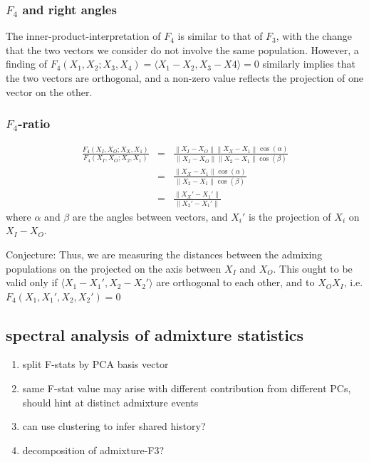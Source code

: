 \documentclass[10pt,a4paper]{article}
\newcommand{\norm}[1]{\left\lVert#1\right\rVert}
\begin{document}
\subsubsection{$F_4$ and right angles}
The inner-product-interpretation of $F_4$ is similar to that of $F_3$, with the change that the two vectors we consider do not involve the same population. However, a finding of $F_4(X_1, X_2; X_3, X_4) = \langle X_1 - X_2, X_3 - X4 \rangle = 0$ similarly implies that the two vectors are orthogonal, and a non-zero value reflects the projection of one vector on the other.

\subsubsection{$F_4$-ratio}
\begin{eqnarray}
\frac{F_4(X_I, X_O; X_X, X_1)}{F_4(X_I, X_O; X_2, X_1)} &=& \frac{\norm{X_I-X_O}\norm{X_X-X_1}\cos(\alpha)}{\norm{X_I-X_O}\norm{X_2-X_1}\cos(\beta)}\nonumber\\
&=&\frac{\norm{X_X-X_1}\cos(\alpha)}{\norm{X_2-X_1}\cos(\beta)}\nonumber\\
&=& \frac{\norm{X_X' - X_1'}}{\norm{X_2' - X_1'}}
\end{eqnarray}
where $\alpha$ and $\beta$ are the angles between vectors, and $X_i'$ is the projection of $X_i$ on $X_I-X_O$.

Conjecture: Thus, we are measuring the distances between the admixing populations on the projected on the axis between $X_I$ and $X_O$. This ought to be valid only if $\langle X_1 - X_1', X_2 - X_2' \rangle$ are orthogonal to each other, and to $X_OX_I$, i.e.
$F_4(X_1, X_1', X_2, X_2') = 0$
 
	
\subsection{spectral analysis of admixture statistics}
\begin{enumerate}
	\item split F-stats by PCA basis vector
	\item same F-stat value may arise with different contribution from different PCs, should hint at distinct admixture events
	\item can use clustering to infer shared history?
	\item decomposition of admixture-F3?
\end{enumerate}
\end{document}
